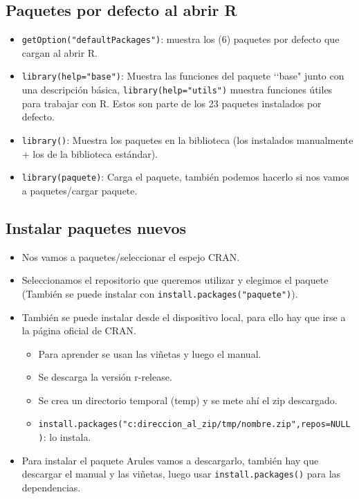 \documentclass[a4paper, 12pt]{article}
\begin{document}
	\subsection{Paquetes por defecto al abrir R}
	\begin{itemize}
		\item \texttt{getOption("defaultPackages")}: muestra los (6) paquetes por defecto que cargan al abrir R.
		\item \texttt{library(help="base")}: Muestra las funciones del paquete ‘‘base" junto con una descripción básica, \texttt{library(help=\string"utils")} muestra funciones útiles para trabajar con R. Estos son parte de los 23 paquetes instalados por defecto.
		\item \texttt{library()}: Muestra los paquetes en la biblioteca (los instalados manualmente + los de la biblioteca estándar).
		\item \texttt{library(paquete)}: Carga el paquete, también podemos hacerlo si nos vamos a paquetes/cargar paquete.
	\end{itemize}
	\subsection{Instalar paquetes nuevos}
	\begin{itemize}
		\item Nos vamos a paquetes/seleccionar el espejo CRAN.
		\item Seleccionamos el repositorio que queremos utilizar y elegimos el paquete (También se puede instalar con \texttt{install.packages(\string"paquete")}).
		\item También se puede instalar desde el dispositivo local, para ello hay que irse a la página oficial de CRAN.
		\begin{itemize}
			\item Para aprender se usan las viñetas y luego el manual.
			\item Se descarga la versión r-release.
			\item Se crea un directorio temporal (temp) y se mete ahí el zip descargado.
			\item \texttt{install.packages(\string"c:direccion\_al\_zip/tmp/nombre.zip",repos=NULL)}: lo instala.
		\end{itemize} 
		\item Para instalar el paquete Arules vamos a descargarlo, también hay que descargar el manual y las viñetas, luego usar \texttt{install.packages()} para las dependencias.
	\end{itemize}
	
\end{document}
